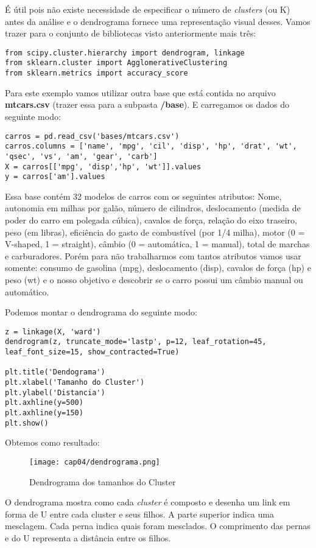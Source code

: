 É útil pois não existe necessidade de especificar o número de \textit{clusters} (ou K) antes da análise e o dendrograma fornece uma representação visual desses. Vamos trazer para o conjunto de bibliotecas visto anteriormente mais três:
\begin{lstlisting}[]
from scipy.cluster.hierarchy import dendrogram, linkage
from sklearn.cluster import AgglomerativeClustering
from sklearn.metrics import accuracy_score
\end{lstlisting}

Para este exemplo vamos utilizar outra base que está contida no arquivo \textbf{mtcars.csv} (trazer essa para a subpasta \textbf{/base}). E carregamos os dados do seguinte modo:
\begin{lstlisting}[]
carros = pd.read_csv('bases/mtcars.csv')
carros.columns = ['name', 'mpg', 'cil', 'disp', 'hp', 'drat', 'wt', 'qsec', 'vs', 'am', 'gear', 'carb']
X = carros[['mpg', 'disp','hp', 'wt']].values
y = carros['am'].values
\end{lstlisting}

Essa base contém 32 modelos de carros com os seguintes atributos: Nome, autonomia em milhas por galão, número de cilindros, deslocamento (medida de poder do carro em polegada cúbica), cavalos de força, relação do eixo traseiro, peso (em libras), eficiência do gasto de combustível (por 1/4 milha), motor (0 = V-shaped, 1 = straight), câmbio (0 = automática, 1 = manual), total de marchas e carburadores. Porém para não trabalharmos com tantos atributos vamos usar somente: consumo de gasolina (mpg), deslocamento (disp), cavalos de força (hp) e peso (wt) e o nosso objetivo e descobrir se o carro possui um câmbio manual ou automático.

Podemos montar o dendrograma do seguinte modo: 
\begin{lstlisting}[]
z = linkage(X, 'ward')
dendrogram(z, truncate_mode='lastp', p=12, leaf_rotation=45, leaf_font_size=15, show_contracted=True)

plt.title('Dendograma')
plt.xlabel('Tamanho do Cluster')
plt.ylabel('Distancia')
plt.axhline(y=500)
plt.axhline(y=150)
plt.show()
\end{lstlisting}

Obtemos como resultado:
\begin{figure}[H]
	\centering
	\texttt{[image: cap04/dendrograma.png]}
	\caption{Dendrograma dos tamanhos do Cluster}
\end{figure}

O dendrograma mostra como cada \textit{cluster} é composto e desenha um link em forma de U entre cada cluster e seus filhos. A parte superior indica uma mesclagem. Cada perna indica quais foram mesclados. O comprimento das pernas e do U representa a distância entre os filhos.

